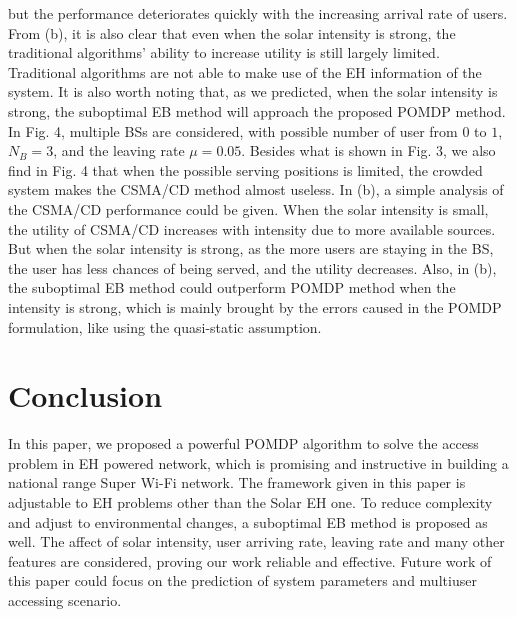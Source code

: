 \documentclass[conference]{IEEEtran}
\begin{document}
but the performance deteriorates quickly with the increasing arrival rate of users.
From (b), it is also clear that even when the solar intensity is strong,
the traditional algorithms' ability to increase utility is still largely limited.
Traditional algorithms are not able to make use of the EH information of the system.
It is also worth noting that, as we predicted, when the solar intensity is strong,
the suboptimal EB method will approach the proposed POMDP method.\\
\indent In Fig. 4, multiple BSs are considered, with possible number of user from \(0\) to \(1\),
\(N_B = 3\), and the leaving rate \(\mu = 0.05\).
Besides what is shown in Fig. 3, we also find in Fig. 4
that when the possible serving positions is limited, the crowded system makes the CSMA/CD method almost useless.
In (b), a simple analysis of the CSMA/CD performance could be given.
When the solar intensity is small, the utility of CSMA/CD increases with intensity due to more available sources.
But when the solar intensity is strong, as the more users are staying in the BS,
the user has less chances of being served, and the utility decreases.
Also, in (b), the suboptimal EB method could outperform POMDP method when the intensity is strong,
which is mainly brought by the errors caused in the POMDP formulation, like using the quasi-static assumption.
\section{Conclusion}
In this paper, we proposed a powerful POMDP algorithm to solve the access problem in EH powered network,
which is promising and instructive in building a national range Super Wi-Fi network.
The framework given in this paper is adjustable to EH problems other than the Solar EH one.
To reduce complexity and adjust to environmental changes, a suboptimal EB method is proposed as well.
The affect of solar intensity, user arriving rate, leaving rate and many other features are considered,
proving our work reliable and effective.
Future work of this paper could focus on the prediction of system parameters and multiuser accessing scenario.


\end{document}
